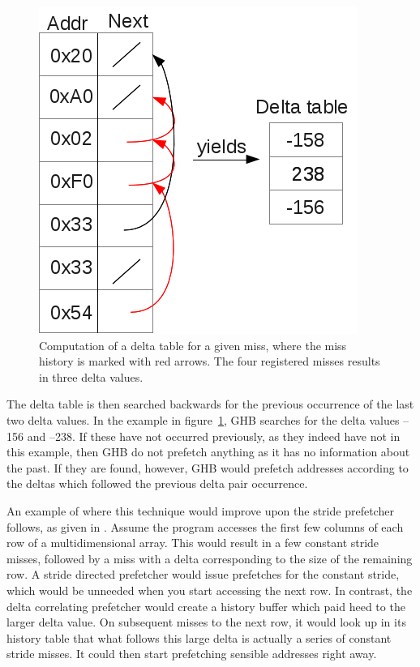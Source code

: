 \begin{figure}[ht]
  \centering
  \includegraphics[scale=0.5]{figures/delta_table_comp.png}
  \caption{\label{fig:deltaTableComp} Computation of a delta table for
    a given miss, where the miss history is marked with red
    arrows. The four registered misses results in three delta values.}
\end{figure}

The delta table is then searched backwards for the previous occurrence
of the last two delta values. In the example in
figure~\ref{fig:deltaTableComp}, GHB searches for the delta values
--156 and --238. If these have not occurred previously, as they indeed
have not in this example, then GHB do not prefetch anything as it has
no information about the past. If they are found, however, GHB would prefetch
addresses according to the deltas which followed the previous delta
pair occurrence. 

An example of where this technique would improve upon the stride
prefetcher follows, as given in \cite{Nesbit}. Assume the program accesses the
first few columns of each row of a multidimensional array. This would
result in a few constant stride misses, followed by a miss with a
delta corresponding to the size of the remaining row. A stride directed
prefetcher would issue prefetches for the constant stride, which would
be unneeded when you start accessing the next row.
In contrast, the delta correlating prefetcher would create a history
buffer which paid heed to the larger delta value. On subsequent misses
to the next row, it would look up in its history table that what
follows this large delta is actually a series of constant stride
misses. It could then start prefetching sensible addresses right away.

